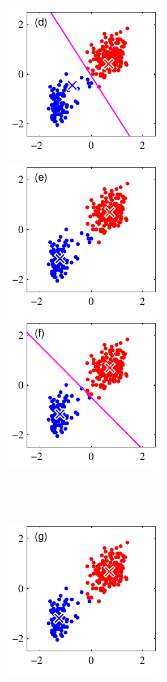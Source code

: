 \begin{figure}[htbp]
\begin{minipage}{0.33\hsize}
\begin{center}
    \end{center}
  \end{minipage}\\
  \begin{minipage}{0.33\hsize}
    \begin{center}
      \includegraphics[width=40mm]{img/kmeans/Figure91d.pdf}
    \end{center}
  \end{minipage}
  \begin{minipage}{0.33\hsize}
    \begin{center}
      \includegraphics[width=40mm]{img/kmeans/Figure91e.pdf}
    \end{center}
  \end{minipage}
  \begin{minipage}{0.33\hsize}
    \begin{center}
      \includegraphics[width=40mm]{img/kmeans/Figure91f.pdf}
    \end{center}
  \end{minipage}\\
  \begin{minipage}{0.33\hsize}
    \begin{center}
      \includegraphics[width=40mm]{img/kmeans/Figure91g.pdf}

\end{center}
\end{minipage}
\end{figure}
